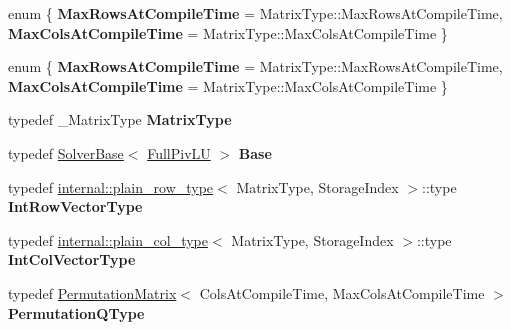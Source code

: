 \begin{DoxyCompactItemize}
\item 
\mbox{\label{group___l_u___module_a85a9f0fc58598afb570c3f72949bcc92}} 
enum \{ {\bfseries Max\+Rows\+At\+Compile\+Time} = Matrix\+Type\+:\+:Max\+Rows\+At\+Compile\+Time, 
{\bfseries Max\+Cols\+At\+Compile\+Time} = Matrix\+Type\+:\+:Max\+Cols\+At\+Compile\+Time
 \}
\item 
\mbox{\label{group___l_u___module_a46c8e62cb270fff7bfda69792d337ecc}} 
enum \{ {\bfseries Max\+Rows\+At\+Compile\+Time} = Matrix\+Type\+:\+:Max\+Rows\+At\+Compile\+Time, 
{\bfseries Max\+Cols\+At\+Compile\+Time} = Matrix\+Type\+:\+:Max\+Cols\+At\+Compile\+Time
 \}
\item 
\mbox{\label{group___l_u___module_a1a547b7b88b78d66a86d58e7250e71cd}} 
typedef \+\_\+\+Matrix\+Type {\bfseries Matrix\+Type}
\item 
\mbox{\label{group___l_u___module_a7dbfc3b86bdc6ac0353f6822aaf6e83d}} 
typedef \hyperlink{class_eigen_1_1_solver_base}{Solver\+Base}$<$ \hyperlink{group___l_u___module_class_eigen_1_1_full_piv_l_u}{Full\+Piv\+LU} $>$ {\bfseries Base}
\item 
\mbox{\label{group___l_u___module_a5d9f1e67b690ba1e644459beea9dfbd4}} 
typedef \hyperlink{struct_eigen_1_1internal_1_1plain__row__type}{internal\+::plain\+\_\+row\+\_\+type}$<$ Matrix\+Type, Storage\+Index $>$\+::type {\bfseries Int\+Row\+Vector\+Type}
\item 
\mbox{\label{group___l_u___module_a458b3a9507557e466256e1de43472981}} 
typedef \hyperlink{struct_eigen_1_1internal_1_1plain__col__type}{internal\+::plain\+\_\+col\+\_\+type}$<$ Matrix\+Type, Storage\+Index $>$\+::type {\bfseries Int\+Col\+Vector\+Type}
\item 
\mbox{\label{group___l_u___module_a9fd5533ea778e72590b05c8b00e6b430}} 
typedef \hyperlink{group___core___module_class_eigen_1_1_permutation_matrix}{Permutation\+Matrix}$<$ Cols\+At\+Compile\+Time, Max\+Cols\+At\+Compile\+Time $>$ {\bfseries Permutation\+Q\+Type}
\item 
\mbox{\label{group___l_u___module_ab2b1221f54f6403e9f9d96e12ee50fac}} 

\end{DoxyCompactItemize}

